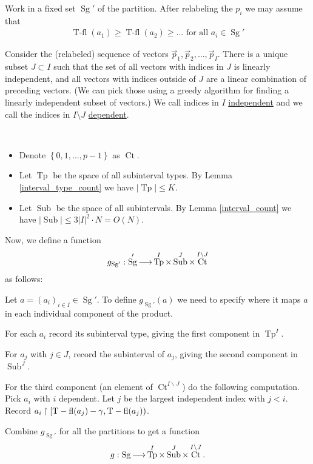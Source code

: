 \documentclass{amsart}
\newcommand{\curly}[1]{\left\{#1\right\}}
\DeclareMathOperator{\Sg}{Sg}
\DeclareMathOperator{\It}{Tp}
\DeclareMathOperator{\Sub}{Sub}
\DeclareMathOperator{\Ct}{Ct}
\DeclareMathOperator{\tfl}{T-fl}
\newcommand{\defn}{\underline}
\begin{document}
Work in a fixed set $\Sg'$ of the partition.
After relabeling the $p_i$ we may assume that
\begin{align*}
  \tfl(a_1) \geq \tfl(a_2) \geq \ldots \text { for all $a_i \in \Sg'$}
\end{align*}

Consider the (relabeled) sequence of vectors $\vec p_1, \vec p_2, \ldots, \vec p_I$.
There is a unique subset $J \subset I$ such that the set of all vectors with indices in $J$ is linearly independent,
and all vectors with indices outside of $J$ are a linear combination of preceding vectors.
(We can pick those using a greedy algorithm for finding a linearly independent subset of vectors.)
We call indices in $I$ \defn{independent} and we call the indices in $I \setminus J$ \defn{dependent}.


\begin{Definition} \ 
  \begin{itemize}
  \item Denote $\curly{0,1, \ldots, p-1}$ as \defn{$\Ct$}.
  \item Let \defn{$\It$} be the space of all subinterval types.
    By Lemma \ref{interval_type_count} we have $|\It| \leq K$.
  \item Let \defn{$\Sub$} be the space of all subintervals.
    By Lemma \ref{interval_count} we have $|\Sub| \leq 3 |I|^2 \cdot N = O(N)$.
  \end{itemize}
\end{Definition}

\begin{Definition}
  Now, we define a function
  \begin{align*}
    g_{\Sg'}: \Sg' \arr \It^I \times \Sub^J \times \Ct^{I \backslash J}
  \end{align*}
  as follows:
  
  Let $a = (a_i)_{i\in I} \in \Sg'$.
  To define $g_{\Sg'}(a)$ we need to specify where it maps $a$ in each individual component of the product.

  For each $a_i$ record its subinterval type, giving the first component in $\It^I$.

  For $a_j$ with $j \in J$, record the subinterval of $a_j$, giving the second component in $\Sub^J$.

  For the third component (an element of $\Ct^{I \backslash J}$) do the following computation.
  Pick $a_i$ with $i$ dependent.
  Let $j$ be the largest independent index with $j < i$.
  Record $a_i \midr [\tfl(a_j) - \gamma, \tfl(a_j))$.

  Combine $g_{\Sg'}$ for all the partitions to get a function 
  \begin{align*}
    g: \Sg \arr \It^I \times \Sub^J \times \Ct^{I \backslash J}.  
  \end{align*}
\end{Definition}
\end{document}
